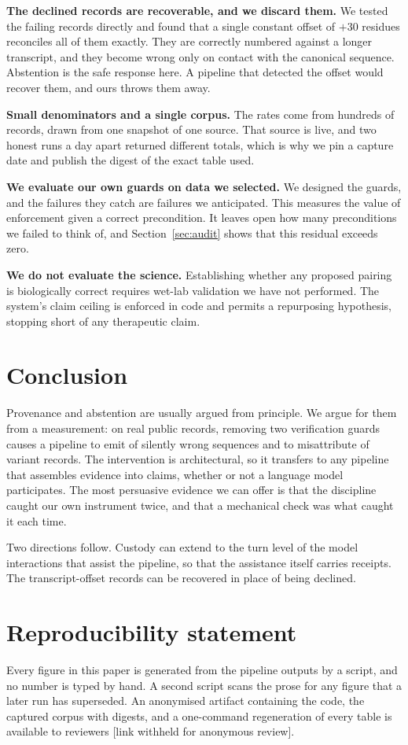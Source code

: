 \documentclass{article}
\begin{document}
\textbf{The declined records are recoverable, and we discard them.} We tested
the failing records directly and found that a single constant offset of $+30$
residues reconciles all \GOneWrong{} of them exactly. They are correctly
numbered against a longer transcript, and they become wrong only on contact
with the canonical sequence. Abstention is the safe response here. A pipeline
that detected the offset would recover them, and ours throws them away.

\textbf{Small denominators and a single corpus.} The rates come from hundreds
of records, drawn from one snapshot of one source. That source is live, and
two honest runs a day apart returned different totals, which is why we pin a
capture date and publish the digest of the exact table used.

\textbf{We evaluate our own guards on data we selected.} We designed the
guards, and the failures they catch are failures we anticipated. This measures
the value of enforcement given a correct precondition. It leaves open how many
preconditions we failed to think of, and Section~\ref{sec:audit} shows that
this residual exceeds zero.

\textbf{We do not evaluate the science.} Establishing whether any proposed
pairing is biologically correct requires wet-lab validation we have not
performed. The system's claim ceiling is enforced in code and permits a
repurposing hypothesis, stopping short of any therapeutic claim.

\section{Conclusion}

Provenance and abstention are usually argued from principle. We argue for them
from a measurement: on real public records, removing two verification guards
causes a pipeline to emit \GOneWrong{} of \GOneNaive{} silently wrong
sequences and to misattribute \GTwoWrong{} of \GTwoNaive{} variant records.
The intervention is architectural, so it transfers to any pipeline that
assembles evidence into claims, whether or not a language model participates.
The most persuasive evidence we can offer is that the discipline caught our
own instrument twice, and that a mechanical check was what caught it each
time.

Two directions follow. Custody can extend to the turn level of the model
interactions that assist the pipeline, so that the assistance itself carries
receipts. The transcript-offset records can be recovered in place of being
declined.

\section*{Reproducibility statement}

Every figure in this paper is generated from the pipeline outputs by a script,
and no number is typed by hand. A second script scans the prose for any figure
that a later run has superseded. An anonymised artifact containing the code,
the captured corpus with digests, and a one-command regeneration of every
table is available to reviewers [link withheld for anonymous review].



\end{document}
